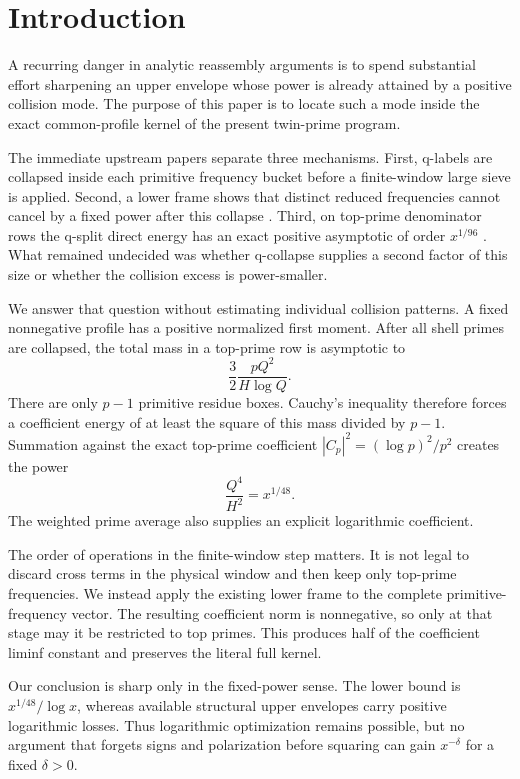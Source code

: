 \section{Introduction}

A recurring danger in analytic reassembly arguments is to spend substantial
effort sharpening an upper envelope whose power is already attained by a
positive collision mode.  The purpose of this paper is to locate such a mode
inside the exact common-profile kernel of the present twin-prime program.

The immediate upstream papers separate three mechanisms.  First, q-labels are
collapsed inside each primitive frequency bucket before a finite-window large
sieve is applied.  Second, a lower frame shows that distinct reduced
frequencies cannot cancel by a fixed power after this collapse
\cite{WangTPC238}.  Third, on top-prime denominator rows the q-split direct
energy has an exact positive asymptotic of order $x^{1/96}$
\cite{WangTPC240}.  What remained undecided was whether q-collapse supplies a
second factor of this size or whether the collision excess is power-smaller.

We answer that question without estimating individual collision patterns.  A
fixed nonnegative profile has a positive normalized first moment.  After all
shell primes are collapsed, the total mass in a top-prime row is asymptotic to
\[
 \frac{3}{2}\frac{pQ^2}{H\log Q}.
\]
There are only $p-1$ primitive residue boxes.  Cauchy's inequality therefore
forces a coefficient energy of at least the square of this mass divided by
$p-1$.  Summation against the exact top-prime coefficient
$|C_p|^2=(\log p)^2/p^2$ creates the power
\[
 \frac{Q^4}{H^2}=x^{1/48}.
\]
The weighted prime average also supplies an explicit logarithmic coefficient.

The order of operations in the finite-window step matters.  It is not legal to
discard cross terms in the physical window and then keep only top-prime
frequencies.  We instead apply the existing lower frame to the complete
primitive-frequency vector.  The resulting coefficient norm is nonnegative,
so only at that stage may it be restricted to top primes.  This produces half
of the coefficient liminf constant and preserves the literal full kernel.

Our conclusion is sharp only in the fixed-power sense.  The lower bound is
$x^{1/48}/\log x$, whereas available structural upper envelopes carry positive
logarithmic losses.  Thus logarithmic optimization remains possible, but no
argument that forgets signs and polarization before squaring can gain
$x^{-\delta}$ for a fixed $\delta>0$.

